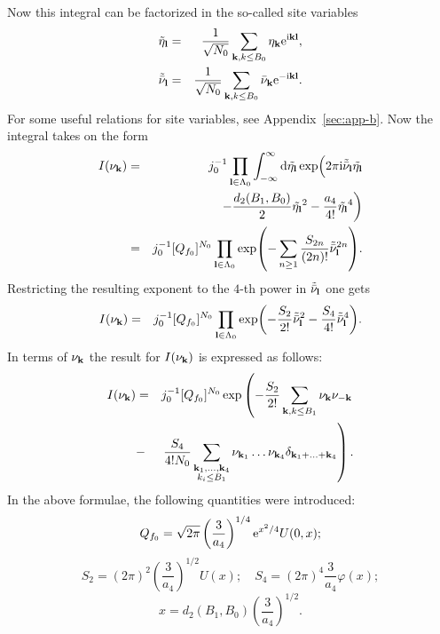 Now this integral can be factorized in the so-called site variables
\begin{eqnarray*}
	\tilde{\eta}_{\vb l} & = & \frac{1}{\sqrt{N_0}}\sum_{\vb k, k \leq B_0}\eta_{\vb k}{\rm e}^{{\rm i}{\vb k}{\vb l}},
	\\
	\tilde{\bar{\nu}}_{\vb l} & = &\frac{1}{\sqrt{N_0}}\sum_{\vb k, k \leq B_0}\bar{\nu}_{\vb k}{\rm e}^{-{\rm i}{\vb k}{\vb l}}.
\end{eqnarray*}
For some useful relations for site variables, see Appendix~\ref{sec:app-b}.
Now the integral takes on the form
\begin{eqnarray*}
	I(\nu_{\vb k}) & = & j_0^{-1} \prod_{\vb l \in \Lambda_0} \int_{-\infty}^{\infty} {\rm d} \tilde{\eta_{\vb l}}
	\exp\Bigl( 2\pi{\rm i} \tilde{\bar{\nu}}_{\vb l} \tilde{\eta_{\vb l}} 
	\\
	&& 
	\left. -\frac{d_2(B_1, B_0)}{2} \tilde{\eta_{\vb l}}^2 - \frac{a_4}{4!}\tilde{\eta_{\vb l}}^4 \right)
	\\
	& = & j_0^{-1} [Q_{f_0}]^{N_0} \prod_{\vb l \in \Lambda_0} \exp(-\sum_{n \geq 1} \frac{S_{2n}}{(2n)!} \tilde{\bar{\nu}}_{\vb l}^{2n}).
\end{eqnarray*}
Restricting the resulting exponent to the $4$-th power in $\tilde{\bar{\nu}}_{\vb l}$ one gets
\begin{eqnarray*}
	I(\nu_{\vb k}) & = & j_0^{-1} [Q_{f_0}]^{N_0} \prod_{\vb l \in \Lambda_0}
	\exp(-\frac{S_2}{2!}\tilde{\bar{\nu}}_{\vb l}^2 - \frac{S_4}{4!}\tilde{\bar{\nu}}_{\vb l}^4 ).
\end{eqnarray*}
In terms of $\nu_{\vb k}$ the result for $I(\nu_{\vb k})$ is expressed as follows:
\begin{eqnarray*}
	I(\nu_{\vb k}) & = & j_0^{-1} [Q_{f_0}]^{N_0} 
	\exp \left(- \frac{S_2}{2!} \sum_{\vb k, k \leq B_1} \nu_{\vb k} \nu_{-\vb k}
	\right.
	\\
	& - & \left.
	 \frac{S_4}{4! N_0} \sum_{\substack{\vb k_1, \dotsc, \vb k_4 \\ k_i \leq B_1}} \nu_{\vb k_1} \dotsc \nu_{\vb k_4} \delta_{\vb{k}_1 + \dotsc + \vb{k}_4}
	 \right)
	 .
\end{eqnarray*}
In the above formulae, the following quantities were introduced:
\begin{equation*}
	Q_{f_0} = \sqrt{2\pi}\left(\frac{3}{a_4}\right)^{1/4} {\rm e}^{x^2/4} U(0,x);
\end{equation*}
\begin{equation*}
	S_2 = (2\pi)^2 \left(\frac{3}{a_4}\right)^{1/2} U(x); \quad S_4 = (2\pi)^4 \frac{3}{a_4}\varphi(x);
\end{equation*}
\begin{equation*}
	x = d_2(B_1, B_0) \left(\frac{3}{a_4}\right)^{1/2}.
\end{equation*}

